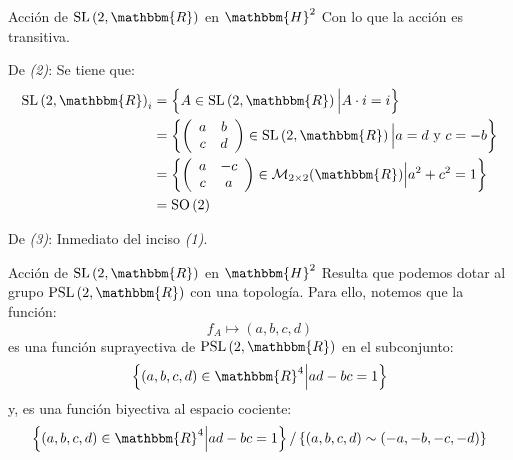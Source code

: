 \documentclass[xcolor=dvipsnames]{beamer}
\theoremstyle{largebreak}
\newcommand{\bbm}[1]{\ensuremath{\mathbbm{#1}}}
\newcommand{\SO}[1]{\ensuremath{\textup{SO}\left(#1\right)}}
\newcommand{\SL}[1]{\ensuremath{\textup{SL}\left(#1\right)}}
\newcommand{\PSL}[1]{\ensuremath{\textup{PSL}\left(#1\right)}}
\begin{document}
\begin{frame}{Acción de $\SL{2,\bbm{R}}$ en $\bbm{H}^2$}
    Con lo que la acción es transitiva.
    
    De \textit{(2)}: Se tiene que:
    \begin{equation*}
        \begin{split}
            \SL{2,\bbm{R}}_i&=\left\{A\in\SL{2,\bbm{R}}\Big|A\cdot i=i \right\}\\
            &=\left\{\left(\begin{array}{cc}
                a & b \\
                c & d \\
            \end{array} \right) \in\SL{2,\bbm{R}}\Big|a = d\textup{ y }c=-b \right\}\\
            &=\left\{\left(\begin{array}{cc}
                a & -c \\
                c & a \\
            \end{array} \right) \in\mathcal{M}_{2\times2}(\bbm{R}) \Big|a^2+c^2=1 \right\}\\
            &=\SO{2}\\
        \end{split}
    \end{equation*}

    De \textit{(3)}: Inmediato del inciso \textit{(1)}.
\end{frame}

\begin{frame}{Acción de $\SL{2,\bbm{R}}$ en $\bbm{H}^2$}
    Resulta que podemos dotar al grupo $\PSL{2,\bbm{R}}$ con una topología. Para ello, notemos que la función:
    \begin{equation*}
        f_A\mapsto (a,b,c,d)
    \end{equation*}
    es una función suprayectiva de $\PSL{2,\bbm{R}}$ en el subconjunto:
    \begin{equation*}
        \left\{(a,b,c,d)\in\bbm{R}^4\Big|ad-bc=1 \right\}
    \end{equation*}
    y, es una función biyectiva al espacio cociente:
    \begin{equation*}
        \left\{(a,b,c,d)\in\bbm{R}^4\Big|ad-bc=1 \right\}/\left\{(a,b,c,d)\sim(-a,-b,-c,-d) \right\}
    \end{equation*}
\end{frame}
\end{document}

